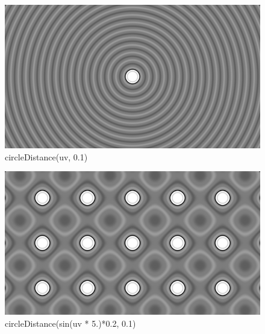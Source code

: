 \begin{figure}[h!]
    \centering

    \begin{minipage}{0.45\textwidth}
        \centering
        \includegraphics[width=\linewidth]{imagens/domainRepetition-circle.png}\\
        circleDistance(uv, 0.1)
    \end{minipage}%
    \hfill
    \begin{minipage}{0.45\textwidth}
        \centering
        \includegraphics[width=\linewidth]{imagens/domainRepetition-sine.png}\\
        circleDistance(sin(uv * 5.)*0.2, 0.1)
    \end{minipage}

    \vspace{1em} %


\end{figure}
